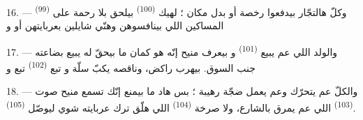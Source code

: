 16. --- وكلّ هالتجّار بيدفعوا رخصة أو بدل مكان ؛ لهيك
 \textsuperscript{(100)} بيلحق بلا رحمة على
 \textsuperscript{(99)} المساكين اللي
بينافسوهن وهنّي شايلين بعربايتهن  أو
و

\VUsaut{4.0mm}
\VUsaut{3.0mm}

17. --- والولد اللي عم يبيع  \textsuperscript{(101)}
و بيعرف منيح إنّه هو كمان ما بيحقّ له يبيع بضاعته جنب
السوق. بيهرب راكض، وناقصه يكبّ سلّة 
و تبع  \textsuperscript{(102)} تبع
 و

18. --- والكلّ عم يتحرّك وعم يعمل ضجّة رهيبة ؛ بس هاد ما بيمنع إنّك
تسمع منيح صوت  \textsuperscript{(103)} اللي عم يمرق
بالشارع، ولا صرخة  \textsuperscript{(104)} اللي هلّق
ترك عربايته شوي ليوصّل  \textsuperscript{(105)}.
